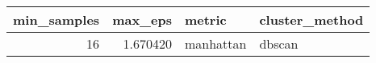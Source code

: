 \begin{tabular}{rrll}
\toprule
min_samples & max_eps & metric & cluster_method \\
\midrule
16 & 1.670420 & manhattan & dbscan \\
\bottomrule
\end{tabular}
